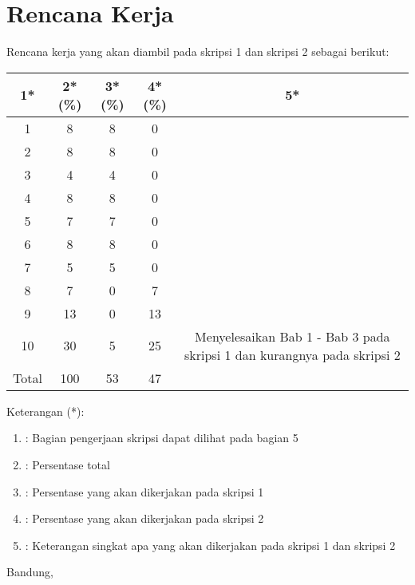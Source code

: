 \documentclass[a4paper,twoside]{article}
\begin{document}
\section{Rencana Kerja}
Rencana kerja yang akan diambil pada skripsi 1 dan skripsi 2 sebagai berikut:
\begin{table}[H]
	\centering
	\begin{tabular}{|c|c|c|c|c|}
		\hline
		1* & 2*(\%) & 3*(\%) & 4*(\%) & 5*\\
		\hline
		1 & 8 & 8 & 0 & \\
		\hline
		2 & 8 & 8 & 0 & \\
		\hline
		3 & 4 & 4 & 0 & \\
		\hline
		4 & 8 & 8 & 0 & \\
		\hline
		5 & 7 & 7 & 0 &\\
		\hline
		6 & 8 & 8 & 0 & \\
		\hline
		7 & 5 & 5 & 0 & \\
		\hline
		8 & 7 & 0 & 7 & \\
		\hline
		9 & 13 & 0 & 13 & \\
		\hline
		10 & 30 & 5 & 25 & Menyelesaikan Bab 1 - Bab 3 pada skripsi 1 dan kurangnya pada skripsi 2\\
		\hline
		Total & 100 & 53 & 47 &  \\
		\hline
		
	\end{tabular}
\end{table}	

Keterangan (*):
\begin{enumerate}
	\item : Bagian pengerjaan skripsi dapat dilihat pada bagian 5 
	\item : Persentase total
	\item : Persentase yang akan dikerjakan pada skripsi 1
	\item : Persentase yang akan dikerjakan pada skripsi 2
	\item : Keterangan singkat apa yang akan dikerjakan pada skripsi 1 dan skripsi 2
\end{enumerate}


\vspace{1cm}
\centering Bandung, \tanggal\\
\vspace{2cm} \nama \\ 
\vspace{1cm}
\end{document}
